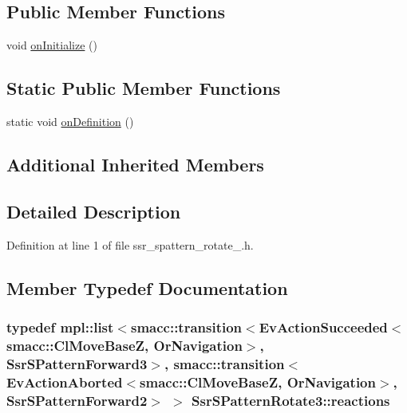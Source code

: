 \subsection*{Public Member Functions}
\begin{DoxyCompactItemize}
\item 
void \hyperlink{structSsrSPatternRotate3_a343a04a297e2b3801e4f7224fa6517a5}{on\+Initialize} ()
\end{DoxyCompactItemize}
\subsection*{Static Public Member Functions}
\begin{DoxyCompactItemize}
\item 
static void \hyperlink{structSsrSPatternRotate3_abd553dc366393f10fb622eb717b92f1b}{on\+Definition} ()
\end{DoxyCompactItemize}
\subsection*{Additional Inherited Members}


\subsection{Detailed Description}


Definition at line 1 of file ssr\+\_\+spattern\+\_\+rotate\+\_.\+h.



\subsection{Member Typedef Documentation}
\subsubsection[{\texorpdfstring{reactions}{reactions}}]{\setlength{\rightskip}{0pt plus 5cm}typedef mpl\+::list$<${\bf smacc\+::transition}$<$Ev\+Action\+Succeeded$<${\bf smacc\+::\+Cl\+Move\+BaseZ}, Or\+Navigation$>$, {\bf Ssr\+S\+Pattern\+Forward3}$>$, {\bf smacc\+::transition}$<$Ev\+Action\+Aborted$<${\bf smacc\+::\+Cl\+Move\+BaseZ}, Or\+Navigation$>$, {\bf Ssr\+S\+Pattern\+Forward2}$>$ $>$ {\bf Ssr\+S\+Pattern\+Rotate3\+::reactions}}\hypertarget{structSsrSPatternRotate3_a2a8df9f21e221d6dc03c8c2edc0ef8b3}{}\label{structSsrSPatternRotate3_a2a8df9f21e221d6dc03c8c2edc0ef8b3}


